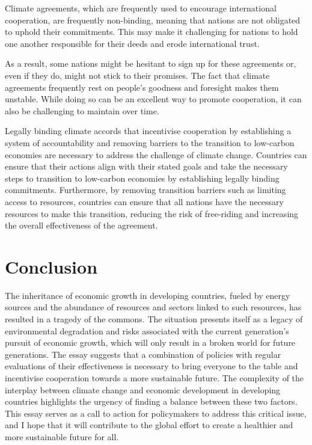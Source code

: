 \documentclass[12pt,a4paper]{article}
\begin{document}
Climate agreements, which are frequently used to encourage international cooperation, are frequently non-binding, meaning that nations are not obligated to uphold their commitments. This may make it challenging for nations to hold one another responsible for their deeds and erode international trust.  \par
As a result, some nations might be hesitant to sign up for these agreements or, even if they do, might not stick to their promises. The fact that climate agreements frequently rest on people's goodness and foresight makes them unstable. While doing so can be an excellent way to promote cooperation, it can also be challenging to maintain over time. \par
Legally binding climate accords that incentivise cooperation by establishing a system of accountability and removing barriers to the transition to low-carbon economies are necessary to address the challenge of climate change. Countries can ensure that their actions align with their stated goals and take the necessary steps to transition to low-carbon economies by establishing legally binding commitments. Furthermore, by removing transition barriers such as limiting access to resources, countries can ensure that all nations have the necessary resources to make this transition, reducing the risk of free-riding and increasing the overall effectiveness of the agreement.
\section*{Conclusion}
The inheritance of economic growth in developing countries, fueled by energy sources and the abundance of resources and sectors linked to such resources, has resulted in a tragedy of the commons. The situation presents itself as a legacy of environmental degradation and risks associated with the current generation's pursuit of economic growth, which will only result in a broken world for future generations. The essay suggests that a combination of policies with regular evaluations of their effectiveness is necessary to bring everyone to the table and incentivise cooperation towards a more sustainable future. The complexity of the interplay between climate change and economic development in developing countries highlights the urgency of finding a balance between these two factors. This essay serves as a call to action for policymakers to address this critical issue, and I hope that it will contribute to the global effort to create a healthier and more sustainable future for all.

\printbibliography
\end{document}

